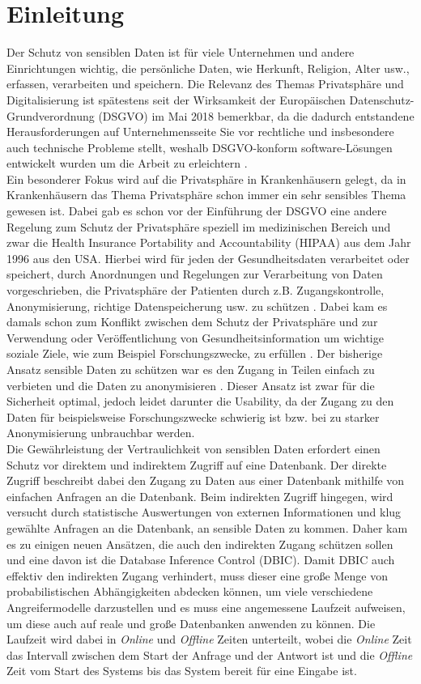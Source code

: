 \documentclass[german,version-2020-11]{uzl-thesis}
\begin{document}
\chapter{Einleitung}
Der Schutz von sensiblen Daten ist für viele Unternehmen und andere Einrichtungen wichtig, die persönliche Daten, wie Herkunft, Religion, Alter usw., erfassen, verarbeiten und speichern. Die Relevanz des Themas Privatsphäre und Digitalisierung ist spätestens seit der Wirksamkeit der Europäischen Datenschutz-Grundverordnung (DSGVO) \cite{1} im  Mai 2018 bemerkbar, da die dadurch entstandene Herausforderungen auf Unternehmensseite Sie vor rechtliche und insbesondere auch technische Probleme stellt, weshalb DSGVO-konform software-Lösungen entwickelt wurden um die Arbeit zu erleichtern \cite{9}.\\ 
Ein besonderer Fokus wird auf die Privatsphäre in Krankenhäusern gelegt, da in Krankenhäusern das Thema Privatsphäre schon immer ein sehr sensibles Thema gewesen ist. Dabei gab es schon vor der Einführung der DSGVO eine andere Regelung zum Schutz der Privatsphäre speziell im medizinischen Bereich und zwar die Health Insurance Portability and Accountability (HIPAA) aus dem Jahr 1996 aus den USA. Hierbei wird für jeden der Gesundheitsdaten verarbeitet oder speichert, durch Anordnungen und Regelungen zur Verarbeitung von Daten vorgeschrieben, die Privatsphäre der Patienten durch z.B. Zugangskontrolle, Anonymisierung, richtige Datenspeicherung usw. zu schützen \cite{7}. Dabei kam es damals schon zum Konflikt zwischen dem Schutz der Privatsphäre und zur Verwendung oder Veröffentlichung von Gesundheitsinformation um wichtige soziale Ziele, wie zum Beispiel Forschungszwecke, zu erfüllen \cite{8}. Der bisherige Ansatz sensible Daten zu schützen war es den Zugang in Teilen einfach zu verbieten und die Daten zu anonymisieren \cite{2}. Dieser Ansatz ist zwar für die Sicherheit optimal, jedoch leidet darunter die Usability, da der Zugang zu den Daten für beispielsweise Forschungszwecke schwierig ist bzw. bei zu starker Anonymisierung unbrauchbar werden. \\ 
Die Gewährleistung der Vertraulichkeit von sensiblen Daten erfordert einen Schutz vor direktem und indirektem Zugriff auf eine Datenbank. Der direkte Zugriff beschreibt dabei den Zugang zu Daten aus einer Datenbank mithilfe von einfachen Anfragen an die Datenbank. Beim indirekten Zugriff hingegen, wird versucht durch statistische Auswertungen von externen Informationen und klug gewählte Anfragen an die Datenbank, an sensible Daten zu kommen.   Daher kam es zu einigen neuen Ansätzen, die auch den indirekten Zugang schützen sollen und eine davon ist die Database Inference Control (DBIC). Damit DBIC auch effektiv den indirekten Zugang verhindert, muss dieser eine große Menge von probabilistischen Abhängigkeiten abdecken können, um viele verschiedene Angreifermodelle darzustellen und es muss eine angemessene Laufzeit aufweisen, um diese auch auf reale und große Datenbanken anwenden zu können. Die Laufzeit wird dabei in \textit{Online} und \textit{Offline} Zeiten unterteilt, wobei die \textit{Online} Zeit das Intervall zwischen dem Start der Anfrage und der Antwort ist und die \textit{Offline} Zeit vom Start des Systems bis das System bereit für eine Eingabe ist. \\
\end{document}
